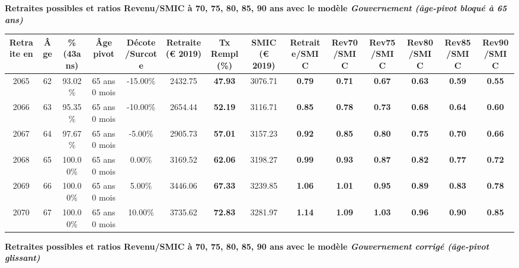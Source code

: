{\bf \noindent Retraites possibles et ratios Revenu/SMIC à 70, 75, 80, 85, 90 ans avec le modèle \emph{Gouvernement (âge-pivot bloqué à 65 ans)}}  
 
\begin{adjustbox}{max width=\textwidth} 
\begin{tabular}[htb]{|c|c||c|c|c||c|c||c||c|c|c|c|c|c|} 
\hline 
 Retraite en &  Âge &  \%(43ans) &  Âge pivot &  Décote/Surcote &  Retraite (\euro{} 2019) &  Tx Rempl(\%) &  SMIC (\euro{} 2019) &  Retraite/SMIC &  Rev70/SMIC &  Rev75/SMIC &  Rev80/SMIC &  Rev85/SMIC &  Rev90/SMIC \\ 
\hline \hline 
 2065 &  62 &  93.02\% &  65 ans 0 mois &  -15.00\% &  2432.75 &  {\bf 47.93} &  3076.71 &  {\bf {\color{red} 0.79}} &  {\bf {\color{red} 0.71}} &  {\bf {\color{red} 0.67}} &  {\bf {\color{red} 0.63}} &  {\bf {\color{red} 0.59}} &  {\bf {\color{red} 0.55}} \\ 
\hline 
 2066 &  63 &  95.35\% &  65 ans 0 mois &  -10.00\% &  2654.44 &  {\bf 52.19} &  3116.71 &  {\bf {\color{red} 0.85}} &  {\bf {\color{red} 0.78}} &  {\bf {\color{red} 0.73}} &  {\bf {\color{red} 0.68}} &  {\bf {\color{red} 0.64}} &  {\bf {\color{red} 0.60}} \\ 
\hline 
 2067 &  64 &  97.67\% &  65 ans 0 mois &  -5.00\% &  2905.73 &  {\bf 57.01} &  3157.23 &  {\bf {\color{red} 0.92}} &  {\bf {\color{red} 0.85}} &  {\bf {\color{red} 0.80}} &  {\bf {\color{red} 0.75}} &  {\bf {\color{red} 0.70}} &  {\bf {\color{red} 0.66}} \\ 
\hline 
 2068 &  65 &  100.00\% &  65 ans 0 mois &  0.00\% &  3169.52 &  {\bf 62.06} &  3198.27 &  {\bf {\color{red} 0.99}} &  {\bf {\color{red} 0.93}} &  {\bf {\color{red} 0.87}} &  {\bf {\color{red} 0.82}} &  {\bf {\color{red} 0.77}} &  {\bf {\color{red} 0.72}} \\ 
\hline 
 2069 &  66 &  100.00\% &  65 ans 0 mois &  5.00\% &  3446.06 &  {\bf 67.33} &  3239.85 &  {\bf 1.06} &  {\bf 1.01} &  {\bf {\color{red} 0.95}} &  {\bf {\color{red} 0.89}} &  {\bf {\color{red} 0.83}} &  {\bf {\color{red} 0.78}} \\ 
\hline 
 2070 &  67 &  100.00\% &  65 ans 0 mois &  10.00\% &  3735.62 &  {\bf 72.83} &  3281.97 &  {\bf 1.14} &  {\bf 1.09} &  {\bf 1.03} &  {\bf {\color{red} 0.96}} &  {\bf {\color{red} 0.90}} &  {\bf {\color{red} 0.85}} \\ 
\hline 
\hline 
\end{tabular} 
\end{adjustbox} 
 
 \vspace{0.1cm} 
{\bf \noindent Retraites possibles et ratios Revenu/SMIC à 70, 75, 80, 85, 90 ans avec le modèle \emph{Gouvernement corrigé (âge-pivot glissant)}}  
 
